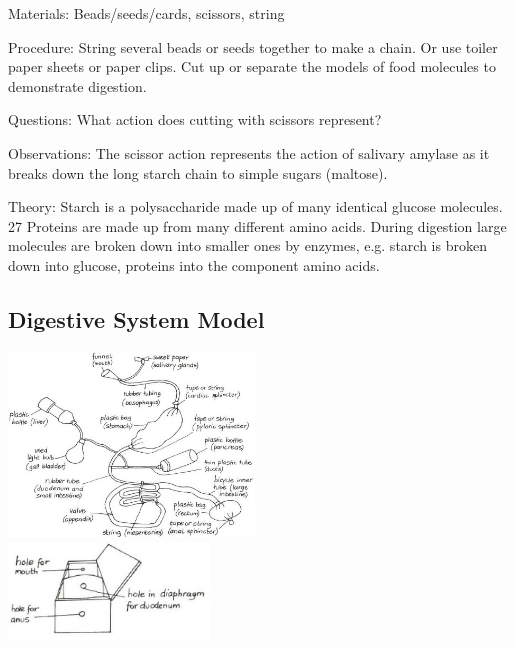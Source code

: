 \begin{multicols}{2}
\begin{description*}
\item[Materials:]{Beads/seeds/cards, scissors, string}
\item[Procedure:]{String several beads or seeds together to make a chain. Or use toiler paper sheets or paper clips. Cut up or separate the models of food molecules to
demonstrate digestion.}
\item[Questions:]{What action does cutting with scissors represent?}
\item[Observations:]{The scissor action represents the action of salivary amylase as it breaks down the long
starch chain to simple sugars (maltose).}
\item[Theory:]{Starch is a polysaccharide made up of many identical glucose molecules. 27
Proteins are made up from many different amino acids. During
digestion large molecules are broken down into smaller ones by
enzymes, e.g. starch is broken down into glucose, proteins into the
component amino acids.}
\end{description*}

\vfill
\columnbreak

\subsection{Digestive System Model} %

\begin{center}
\includegraphics[width=0.49\textwidth]{./img/vso/digestive-sys-model.jpg} \\[6pt]
\includegraphics[width=0.4\textwidth]{./img/vso/digestive-sys-model-2.jpg}
\end{center}


\end{multicols}
